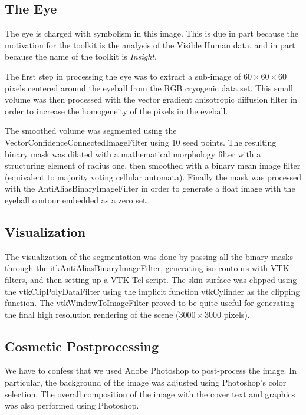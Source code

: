 \subsection*{The Eye} 

The eye is charged with symbolism in this image. This is due in part because
the motivation for the toolkit is the analysis of the Visible Human data,
and in part because the name of the toolkit is \emph{Insight}.

The first step in processing the eye was to extract a sub-image of
$60\times60\times60$ pixels centered around the eyeball from the RGB
cryogenic data set. This small volume was then processed with the vector
gradient anisotropic diffusion filter in order to increase the homogeneity of
the pixels in the eyeball.

The smoothed volume was segmented using the
VectorConfidenceConnectedImageFilter using 10 seed points. The resulting
binary mask was dilated with a mathematical morphology filter with a
structuring element of radius one, then smoothed with a binary mean image
filter (equivalent to majority voting cellular automata). Finally the mask
was processed with the AntiAliasBinaryImageFilter in order to generate a
float image with the eyeball contour embedded as a zero set.

\subsection*{Visualization}

The visualization of the segmentation was done by passing all the binary
masks through the itkAntiAliasBinaryImageFilter, generating iso-contours with
VTK filters, and then setting up a VTK Tcl script. The skin surface was
clipped using the vtkClipPolyDataFilter using the implicit function
vtkCylinder as the clipping function. The vtkWindowToImageFilter proved to be
quite useful for generating the final high resolution rendering of the scene
($3000\times3000$ pixels).

\subsection*{Cosmetic Postprocessing}

We have to confess that we used Adobe Photoshop to post-process the image. In
particular, the background of the image was adjusted using Photoshop's color
selection. The overall composition of the image with the cover text and
graphics was also performed using Photoshop.

